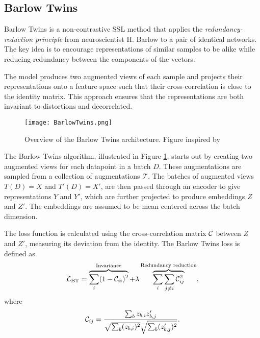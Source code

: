 \documentclass[../../thesis.tex]{subfiles}
\begin{document}

\subsection{Barlow Twins}

Barlow Twins is a non-contrastive SSL method that applies the \textit{redundancy-reduction principle}\cite{Barlow_origin} from neuroscientist H. Barlow to a pair of identical networks. The key idea is to encourage representations of similar samples to be alike while reducing redundancy between the components of the vectors.\newline

The model produces two augmented views of each sample and projects their representations onto a feature space such that their cross-correlation is close to the identity matrix. This approach ensures that the representations are both invariant to distortions and decorrelated.\newline

\begin{figure}[h]
    \texttt{[image: BarlowTwins.png]}
    \centering    
    \caption{Overview of the Barlow Twins architecture. Figure inspired by \cite{zbontar2021barlow}}
    \label{fig:BarlowTwins}
\end{figure}

The Barlow Twins algorithm, illustrated in Figure \ref{fig:BarlowTwins}, starts out by creating two augmented views for each datapoint in a batch $D$. These augmentations are sampled from a collection of augmentations $\mathcal{T}$. The batches of augmented views $T(D) = X$ and $T'(D) =X'$, are then passed through an encoder to give representations $Y$ and $Y'$, which are further projected to produce embeddings $Z$ and $Z'$. The embeddings are assumed to be mean centered across the batch dimension. \newline

The loss function is calculated using the cross-correlation matrix $\mathcal{C}$ between $Z$ and $Z'$, measuring its deviation from the identity. The Barlow Twins loss is defined as
\begin{equation}
    \label{eq:BTLoss}
    \mathcal{L}_{\text{BT}} = 
    \overbrace{\sum_i (1 - \mathcal{C}_{ii})^2}^{\text{Invariance}}
    +\lambda  \overbrace{\sum_i\sum_{j\neq i} \mathcal{C}_{ij}^2}^{\text{Redundancy reduction}},
\end{equation}
where
\begin{equation}
    \mathcal{C}_{ij} = \frac{\sum_b z_{b,i}z_{b,j}'}{\sqrt{\sum_b (z_{b,i})^2}\sqrt{\sum_b (z_{b,j}')^2}}.
\end{equation}
\end{document}
